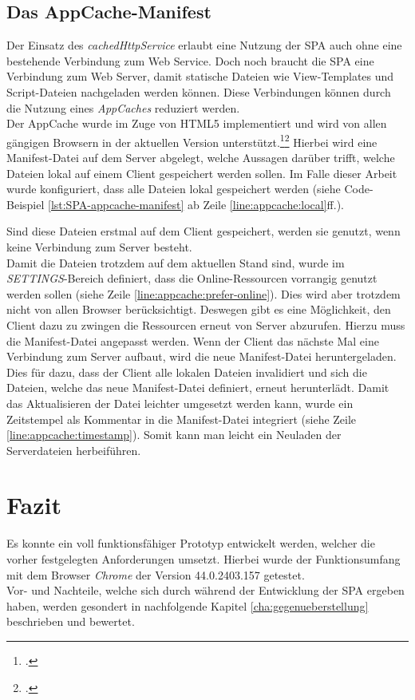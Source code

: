 \subsection{Das AppCache-Manifest}
\label{ssec:appcache-manifest}
Der Einsatz des \textit{cachedHttpService} erlaubt eine Nutzung der \ac{SPA} auch ohne eine bestehende Verbindung zum Web Service. Doch noch braucht die \ac{SPA} eine Verbindung zum Web Server, damit statische Dateien wie View-Templates und Script-Dateien nachgeladen werden können. Diese Verbindungen können durch die Nutzung eines \textit{AppCaches} reduziert werden. \\
Der AppCache wurde im Zuge von \gls{HTML5} implementiert und wird von allen gängigen Browsern in der aktuellen Version unterstützt.\footcite{online:AngularJs:indexedDB:w3c}\footcite{online:caniuse:appcache} Hierbei wird eine Manifest-Datei auf dem Server abgelegt, welche Aussagen darüber trifft, welche Dateien lokal auf einem Client gespeichert werden sollen. Im Falle dieser Arbeit wurde konfiguriert, dass alle Dateien lokal gespeichert werden (siehe Code-Beispiel \ref{lst:SPA-appcache-manifest} ab Zeile \ref{line:appcache:local}ff.). 



Sind diese Dateien erstmal auf dem Client gespeichert, werden sie genutzt, wenn keine Verbindung zum Server besteht. \\
Damit die Dateien trotzdem auf dem aktuellen Stand sind, wurde im \textit{SETTINGS}-Bereich definiert, dass die Online-Ressourcen vorrangig genutzt werden sollen (siehe Zeile \ref{line:appcache:prefer-online}). Dies wird aber trotzdem nicht von allen Browser berücksichtigt. Deswegen gibt es eine Möglichkeit, den Client dazu zu zwingen  die Ressourcen erneut von Server abzurufen. Hierzu muss die Manifest-Datei angepasst werden. Wenn der Client das nächste Mal eine Verbindung zum Server aufbaut, wird die neue Manifest-Datei heruntergeladen. Dies für dazu, dass der Client alle lokalen Dateien invalidiert und sich die Dateien, welche das neue Manifest-Datei definiert, erneut herunterlädt. Damit das Aktualisieren der Datei leichter umgesetzt werden kann, wurde ein Zeitstempel als Kommentar in die Manifest-Datei integriert (siehe Zeile \ref{line:appcache:timestamp}). Somit kann man leicht ein Neuladen der Serverdateien herbeiführen. 
\section{Fazit}
Es konnte ein voll funktionsfähiger Prototyp entwickelt werden, welcher die vorher festgelegten Anforderungen umsetzt. Hierbei wurde der Funktionsumfang mit dem Browser \textit{Chrome} der Version 44.0.2403.157 getestet. \\
Vor- und Nachteile, welche sich durch während der Entwicklung der \ac{SPA} ergeben haben, werden gesondert in nachfolgende Kapitel \ref{cha:gegenueberstellung} beschrieben und bewertet. 

